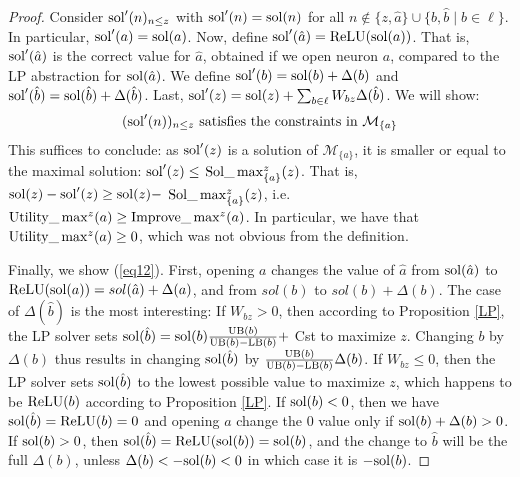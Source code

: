 {%
% 			


 



	
	\begin{proof}
    Consider $\mathrm{sol}'(n)_{n \leq z}$ with
	$\mathrm{sol}'(n)=\mathrm{sol}(n)$ for all $n \notin \{z,\hat{a}\} \cup \{b,\hat{b} \mid b \in \ell\}$. In particular,  $\mathrm{sol}'(a) = \mathrm{sol}(a)$.
	Now, define $\mathrm{sol}'(\hat{a}) = \mathrm{ReLU}(\mathrm{sol}(a))$. 
	That is, $\mathrm{sol}'(\hat{a})$ is the correct value for $\hat{a}$, obtained if we open neuron $a$, compared to the LP abstraction for $\mathrm{sol}(\hat{a})$.
	We define $\mathrm{sol}'(b)=\mathrm{sol}(b)+\Delta(b)$ and 
	$\mathrm{sol}'(\hat{b})=\mathrm{sol}(\hat{b}) + \Delta(\hat{b})$.
	Last, $\mathrm{sol}'(z)=\mathrm{sol}(z) + \sum_{b \in \ell} W_{bz} \Delta(\hat{b})$.
	We will show:
	\begin{equation}
		\label{eq12}
		(\mathrm{sol}'(n))_{n \leq z} \text{ satisfies the constraints in } \mathcal{M}_{\{a\}}
	\end{equation} 
	This suffices to conclude: as
	$\mathrm{sol}'(z)$ is a solution of $\mathcal{M}_{\{a\}}$, it is smaller or equal to the maximal solution: $\mathrm{sol}'(z) \leq$ $\mathrm{Sol}\_\max_{\{a\}}^z(z)$. That is, 
	$\mathrm{sol}(z)-\mathrm{sol}'(z) \geq \mathrm{sol}(z) -$ $\mathrm{Sol}\_\max_{\{a\}}^z(z)$, i.e. 
	$ \mathrm{Utility}\_\max^z(a) \geq \mathrm{Improve}\_\max^z(a)$.
	In particular, we have that $\mathrm{Utility}\_\max^z(a) \geq 0$, which was not obvious from the definition.

	Finally, we show (\ref{eq12}). First, opening $a$ changes the value of $\hat{a}$ from
	$\mathrm{sol}(\hat{a})$ to $\mathrm{ReLU}(\mathrm{sol}(a)) = sol(\hat{a}) + \Delta(a)$, 
	and from $sol(b)$ to $sol(b) + \Delta(b)$.
	The case of $\Delta(\hat{b})$ is the most interesting:
	If $W_{bz}>0$, then according to Proposition \ref{LP}, the LP solver
sets $\mathrm{sol}(\hat{b}) = \mathrm{sol}(b) \frac{\mathrm{UB}(b)}{\mathrm{UB}(b)-\mathrm{LB}(b)} +$ Cst to maximize $z$.
Changing $b$ by $\Delta(b)$ thus results in changing $\mathrm{sol}(\hat{b})$ by 
$\frac{\mathrm{UB}(b)}{\mathrm{UB}(b)-\mathrm{LB}(b)}\Delta(b)$.
If $W_{bz}\leq0$, then the LP solver sets $\mathrm{sol}(\hat{b})$ to the lowest possible value to maximize $z$, which happens to be $\mathrm{ReLU}(b)$ according to Proposition \ref{LP}.
If $\mathrm{sol}(b) < 0$, then we have $\mathrm{sol}(\hat{b})=\mathrm{ReLU}(b)=0$ and opening $a$ change the 0 value only if $\mathrm{sol}(b)+\Delta(b)>0$. If $\mathrm{sol}(b) > 0$, then 
$\mathrm{sol}(\hat{b})=\mathrm{ReLU}(\mathrm{sol}(b))=\mathrm{sol}(b)$, and the change to $\hat{b}$ will be 
the full $\Delta(b)$, unless $\Delta(b) < -\mathrm{sol}(b) < 0$ in which case it is 
$-\mathrm{sol}(b)$.
		\end{proof}
	}

